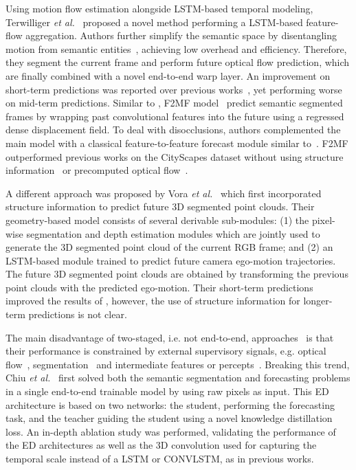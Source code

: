 Using motion flow estimation alongside \ac{LSTM}-based temporal modeling, Terwilliger \textit{et al.}~\cite{Terwilliger2019} proposed a novel method performing a \ac{LSTM}-based feature-flow aggregation. Authors further simplify the semantic space by disentangling motion from semantic entities~\cite{Villegas2017a}, achieving low overhead and efficiency. Therefore, they segment the current frame and perform future optical flow prediction, which are finally combined with a novel end-to-end warp layer. An improvement on short-term predictions was reported over previous works~\cite{Luc2017,Jin2017a}, yet performing worse on mid-term predictions. Similar to \cite{Terwilliger2019}, F2MF model~\cite{Saric2020} predict semantic segmented frames by wrapping past convolutional features into the future using a regressed dense displacement field. To deal with disocclusions, authors complemented the main model with a classical feature-to-feature forecast module similar to~\cite{Chiu2019,Luc2018}. F2MF outperformed previous works on the CityScapes dataset without using structure information~\cite{Vora2018} or precomputed optical flow~\cite{Terwilliger2019}.

A different approach was proposed by Vora \textit{et al.}~\cite{Vora2018} which first incorporated structure information to predict future 3D segmented point clouds. Their geometry-based model consists of several derivable sub-modules: (1) the pixel-wise segmentation and depth estimation modules which are jointly used to generate the \ac{3D} segmented point cloud of the current RGB frame; and (2) an \ac{LSTM}-based module trained to predict future camera ego-motion trajectories. The future \ac{3D} segmented point clouds are obtained by transforming the previous point clouds with the predicted ego-motion. Their short-term predictions improved the results of \cite{Luc2017}, however, the use of structure information for longer-term predictions is not clear.

The main disadvantage of two-staged, i.e. not end-to-end, approaches~\cite{Luc2017,Jin2017a,Nabavi2018,Vora2018,Terwilliger2019} is that their performance is constrained by external supervisory signals, e.g. optical flow~\cite{Revaud2015}, segmentation~\cite{Zhao2017a} and intermediate features or percepts~\cite{Yu2017}. Breaking this trend, Chiu \textit{et al.}~\cite{Chiu2019} first solved both the semantic segmentation and forecasting problems in a single end-to-end trainable model by using raw pixels as input. This \ac{ED} architecture is based on two networks: the student, performing the forecasting task, and the teacher guiding the student using a novel knowledge distillation loss. An in-depth ablation study was performed, validating the performance of the \ac{ED} architectures as well as the 3D convolution used for capturing the temporal scale instead of a \ac{LSTM} or \ac{CONVLSTM}, as in previous works. 

